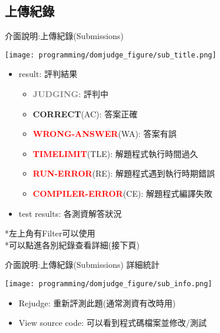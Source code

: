 \documentclass[aspectratio=169,xcolor=dvipsnames]{beamer}
\begin{document}
    \subsection{上傳紀錄}
    \begin{frame}{介面說明:上傳紀錄(Submissions)}
        \centerline{\texttt{[image: programming/domjudge\_figure/sub\_title.png]}}
        \begin{itemize}
            \item result: 評判結果 \\
            \begin{itemize}
                \item \textbf{\textcolor{gray}{JUDGING}}: 評判中
                \item \textbf{\textcolor{OliveGreen}{CORRECT}}(AC): 答案正確
                \item \textbf{\textcolor{red}{WRONG-ANSWER}}(WA): 答案有誤
                \item \textbf{\textcolor{red}{TIMELIMIT}}(TLE): 解題程式執行時間過久
                \item \textbf{\textcolor{red}{RUN-ERROR}}(RE): 解題程式遇到執行時期錯誤
                \item \textbf{\textcolor{red}{COMPILER-ERROR}}(CE): 解題程式編譯失敗
            \end{itemize}
            \item test results: 各測資解答狀況
        \end{itemize}
        
        *左上角有Filter可以使用 \\
        *可以點進各別紀錄查看詳細(接下頁)
    \end{frame}
    
    \begin{frame}{介面說明:上傳紀錄(Submissions)}
        詳細統計 \\
        \centerline{\texttt{[image: programming/domjudge\_figure/sub\_info.png]}}
        \begin{itemize}
            \item Rejudge: 重新評測此題(通常測資有改時用)
            \item View source code: 可以看到程式碼檔案並修改/測試
        \end{itemize}
    \end{frame}
    
\end{document}

